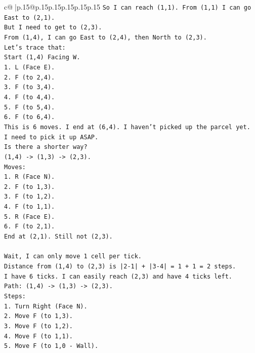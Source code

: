 \documentclass{article}
\begin{document}
{\begin{supertabular}{c@{$\;$}|p{.15\linewidth}@{}p{.15\linewidth}p{.15\linewidth}p{.15\linewidth}p{.15\linewidth}p{.15\linewidth}}
{{{\texttt{So I can reach (1,1). From (1,1) I can go East to (2,1).} \\
\texttt{But I need to get to (2,3).} \\
\texttt{From (1,4), I can go East to (2,4), then North to (2,3).} \\
\texttt{Let's trace that:} \\
\texttt{Start (1,4) Facing W.} \\
\texttt{1. L (Face E).} \\
\texttt{2. F (to 2,4).} \\
\texttt{3. F (to 3,4).} \\
\texttt{4. F (to 4,4).} \\
\texttt{5. F (to 5,4).} \\
\texttt{6. F (to 6,4).} \\
\texttt{This is 6 moves. I end at (6,4). I haven't picked up the parcel yet.} \\
\texttt{I need to pick it up ASAP.} \\
\texttt{Is there a shorter way?} \\
\texttt{(1,4) {-}> (1,3) {-}> (2,3).} \\
\texttt{Moves:} \\
\texttt{1. R (Face N).} \\
\texttt{2. F (to 1,3).} \\
\texttt{3. F (to 1,2).} \\
\texttt{4. F (to 1,1).} \\
\texttt{5. R (Face E).} \\
\texttt{6. F (to 2,1).} \\
\texttt{End at (2,1). Still not (2,3).} \\
\\ 
\texttt{Wait, I can only move 1 cell per tick.} \\
\texttt{Distance from (1,4) to (2,3) is |2{-}1| + |3{-}4| = 1 + 1 = 2 steps.} \\
\texttt{I have 6 ticks. I can easily reach (2,3) and have 4 ticks left.} \\
\texttt{Path: (1,4) {-}> (1,3) {-}> (2,3).} \\
\texttt{Steps:} \\
\texttt{1. Turn Right (Face N).} \\
\texttt{2. Move F (to 1,3).} \\
\texttt{3. Move F (to 1,2).} \\
\texttt{4. Move F (to 1,1).} \\
\texttt{5. Move F (to 1,0 {-} Wall).} \\
}}}
\end{supertabular}}
\end{document}
